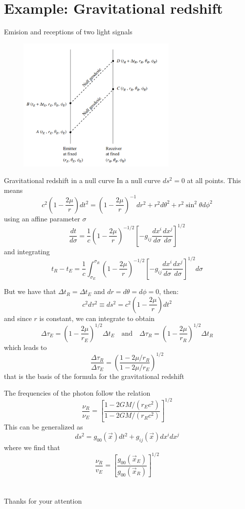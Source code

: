 \documentclass[xcolor=dvipsnames]{beamer}
\begin{document}
\section{Example: Gravitational redshift}
\begin{frame}{Emision and receptions of two light signals}
    \begin{figure}
        \centering
        \includegraphics[width=0.7\textwidth]{Presentations/Images/1_rs.png}
        
    
    \end{figure}
\end{frame}
\begin{frame}{Gravitational redshift in a null curve}
In a null curve $ds^2=0$ at all points. This means
$$
c^{2}\left(1-\frac{2 \mu}{r}\right) d t^{2}=\left(1-\frac{2 \mu}{r}\right)^{-1} d r^{2}+r^{2} d \theta^{2}+r^{2} \sin ^{2} \theta d \phi^{2}
$$
using an affine parameter $\sigma$
$$
\frac{d t}{d \sigma}=\frac{1}{c}\left(1-\frac{2 \mu}{r}\right)^{-1 / 2}\left[-g_{i j} \frac{d x^{i}}{d \sigma} \frac{d x^{j}}{d \sigma}\right]^{1 / 2}
$$
and integrating
$$
t_{R}-t_{E}=\frac{1}{c} \int_{\sigma_{E}}^{\sigma_{R}}\left(1-\frac{2 \mu}{r}\right)^{-1 / 2}\left[-g_{i j} \frac{d x^{i}}{d \sigma} \frac{d x^{j}}{d \sigma}\right]^{1 / 2} d \sigma
$$
\end{frame}
\begin{frame}{}
    But we have that $\Delta t_{R}=\Delta t_{E}$ and $d r=d \theta=d \phi=0$, then:
    $$
c^{2} d \tau^{2} \equiv d s^{2}=c^{2}\left(1-\frac{2 \mu}{r}\right) d t^{2}
$$
and since $r$ is constant, we can integrate to obtain
$$\Delta \tau_{E}=\left(1-\frac{2 \mu}{r_{E}}\right)^{1 / 2} \Delta t_{E} \quad \text{and} \quad \Delta \tau_{R}=\left(1-\frac{2 \mu}{r_{R}}\right)^{1 / 2} \Delta t_{R}$$
which leads to 
$$
\frac{\Delta \tau_{R}}{\Delta \tau_{E}}=\left(\frac{1-2 \mu / r_{R}}{1-2 \mu / r_{E}}\right)^{1 / 2}
$$
that is the basis of the formula for the gravitational redshift
\end{frame}
\begin{frame}{}
The frequencies of the photon follow the relation
    $$
\frac{\nu_{R}}{\nu_{E}}=\left[\frac{1-2 G M /\left(r_{E} c^{2}\right)}{1-2 G M /\left(r_{R} c^{2}\right)}\right]^{1 / 2}
$$
This can be generalized as
$$
d s^{2}=g_{00}(\vec{x}) d t^{2}+g_{i j}(\vec{x}) d x^{i} d x^{j}
$$
where we find that
$$
\frac{\nu_{R}}{v_{E}}=\left[\frac{g_{00}\left(\vec{x}_{E}\right)}{g_{00}\left(\vec{x}_{R}\right)}\right]^{1 / 2}
$$
\end{frame}
\section{}
\begin{frame}[plain]
    \centering
    \Huge Thanks for your attention
\end{frame}
\end{document}

